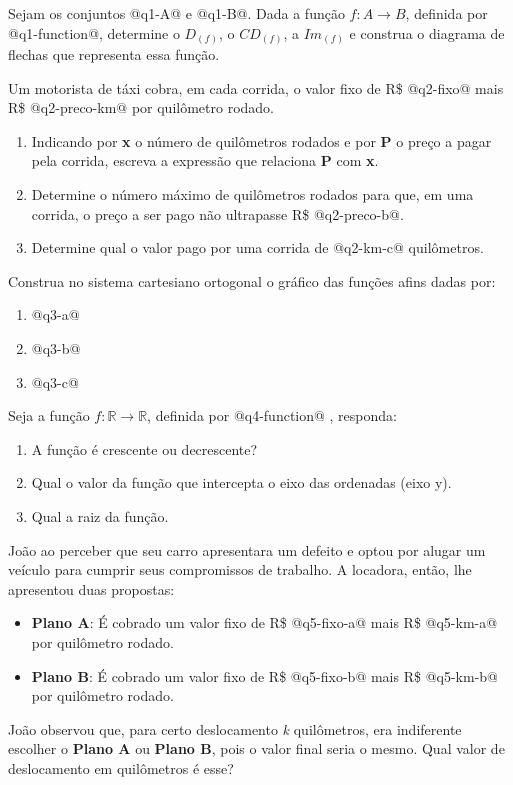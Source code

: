 \documentclass{ufcdocument}
\begin{document}
    \begin{question}
        \item Sejam os conjuntos @q1-A@ e @q1-B@. Dada a função $f:A \rightarrow B$, definida por @q1-function@, determine o $D_{(f)}$, o $CD_{(f)}$, a $Im_{(f)}$ e construa o diagrama de flechas que representa essa função. 

        \item Um motorista de táxi cobra, em cada corrida, o valor fixo de R\$ @q2-fixo@ mais R\$ @q2-preco-km@ por quilômetro rodado.
        \begin{enumerate}[label=\alph*)]
        	\item Indicando por \textbf{x} o número de quilômetros rodados e por \textbf{P} o preço a pagar pela corrida, escreva a expressão que relaciona \textbf{P} com \textbf{x}.  
        	\item Determine o número máximo de quilômetros rodados para que, em uma corrida, o preço a ser pago não ultrapasse R\$ @q2-preco-b@. 
        	\item Determine qual o valor pago por uma corrida de @q2-km-c@ quilômetros. 
        \end{enumerate}
    	\item Construa no sistema cartesiano ortogonal o gráfico das funções afins dadas por:
    	\begin{enumerate}[label=\alph*)]
    		\item @q3-a@ 
    		\item @q3-b@ 
    		\item @q3-c@ 
    	\end{enumerate}
    	\item Seja a função $f:\mathbb{R} \rightarrow \mathbb{R}$, definida por @q4-function@  , responda:
    	\begin{enumerate}[label=\alph*)]
    		\item A função é crescente ou decrescente? 
    		\item Qual o valor da função que intercepta o eixo das ordenadas (eixo y). 
    		\item Qual a raiz da função. 
    	\end{enumerate}
    	\item João ao perceber que seu carro apresentara um defeito e optou por alugar um veículo para cumprir seus compromissos de trabalho. A locadora, então, lhe apresentou duas propostas:
    	\begin{itemize}
    		\item \textbf{Plano A}: É cobrado um valor fixo de R\$ @q5-fixo-a@ mais R\$ @q5-km-a@ por quilômetro rodado.
    		\item \textbf{Plano B}: É cobrado um valor fixo de R\$ @q5-fixo-b@ mais R\$ @q5-km-b@ por quilômetro rodado. 
    	\end{itemize}
    	João observou que, para certo deslocamento \textit{k} quilômetros, era indiferente escolher o \textbf{Plano A} ou \textbf{Plano B}, pois o valor final seria o mesmo. Qual valor de deslocamento em quilômetros é esse? 
    \end{question}
\end{document}
